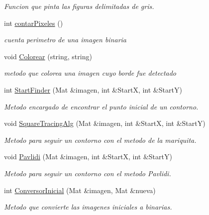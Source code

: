 \begin{DoxyCompactItemize}
\begin{DoxyCompactList}\small\item\em Funcion que pinta las figuras delimitadas de gris. \end{DoxyCompactList}\item 
int \hyperlink{class_algoritmos_a1b33bd5f66e762cd3cd6e238c96c6b7e}{contar\+Pixeles} ()
\begin{DoxyCompactList}\small\item\em cuenta perimetro de una imagen binaria \end{DoxyCompactList}\item 
void \hyperlink{class_algoritmos_a3ec1633159cdf5b3e1a9c8a86df151cd}{Colorear} (string, string)
\begin{DoxyCompactList}\small\item\em metodo que colorea una imagen cuyo borde fue detectado \end{DoxyCompactList}\item 
int \hyperlink{class_algoritmos_ac13812392fa14dd08d07ac6167df72a4}{Start\+Finder} (Mat \&imagen, int \&StartX, int \&StartY)
\begin{DoxyCompactList}\small\item\em Metodo encargado de encontrar el punto inicial de un contorno. \end{DoxyCompactList}\item 
void \hyperlink{class_algoritmos_aebbedc5cd4fab6665d5181556a8da6d9}{Square\+Tracing\+Alg} (Mat \&imagen, int \&StartX, int \&StartY)
\begin{DoxyCompactList}\small\item\em Metodo para seguir un contorno con el metodo de la mariquita. \end{DoxyCompactList}\item 
void \hyperlink{class_algoritmos_a02037880a2a501059f207b53a5950425}{Pavlidi} (Mat \&imagen, int \&StartX, int \&StartY)
\begin{DoxyCompactList}\small\item\em Metodo para seguir un contorno con el metodo Pavlidi. \end{DoxyCompactList}\item 
int \hyperlink{class_algoritmos_a6f6057b572b4f077d0caa0d7838dd77c}{Conversor\+Inicial} (Mat \&imagen, Mat \&nueva)
\begin{DoxyCompactList}\small\item\em Metodo que convierte las imagenes iniciales a binarias. \end{DoxyCompactList}\end{DoxyCompactItemize}
